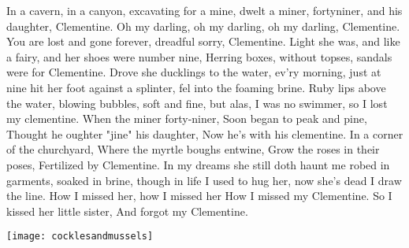 \beginverse
In a cavern, in a canyon,
excavating for a mine,
dwelt a miner, fortyniner, 
and his daughter, Clementine.
\endverse
\beginchorus
Oh my darling, oh my darling,
oh my darling, Clementine.
You are lost and gone forever,
dreadful sorry, Clementine.
\endchorus
\beginverse
Light she was, and like a fairy,
and her shoes were number nine,
Herring boxes, without topses,
sandals were for Clementine.
\endverse
\beginverse
Drove she ducklings to the water,
ev’ry morning, just at nine
hit her foot against a splinter,
fel into the foaming brine.
\endverse
\beginverse
Ruby lips above the water,
blowing bubbles, soft and fine,
but alas, I was no swimmer, 
so I lost my clementine.
\endverse
\beginverse
When the miner forty-niner,
Soon began to peak and pine,
Thought he oughter "jine" his daughter,
Now he's with his clementine.
\endverse
\beginverse
In a corner of the churchyard,
Where the myrtle boughs entwine,
Grow the roses in their poses,
Fertilized by Clementine.
\endverse
\beginverse
In my dreams she still doth haunt me
robed in garments, soaked in brine,
though in life I used to hug her, 
now she’s dead I draw the line.
\endverse
\beginverse
How I missed her, how I missed her
How I missed my Clementine.
So I kissed her little sister,
And forgot my Clementine.
\endverse
\endsong
\begin{intersong}
    \texttt{[image: cocklesandmussels]}
\end{intersong}